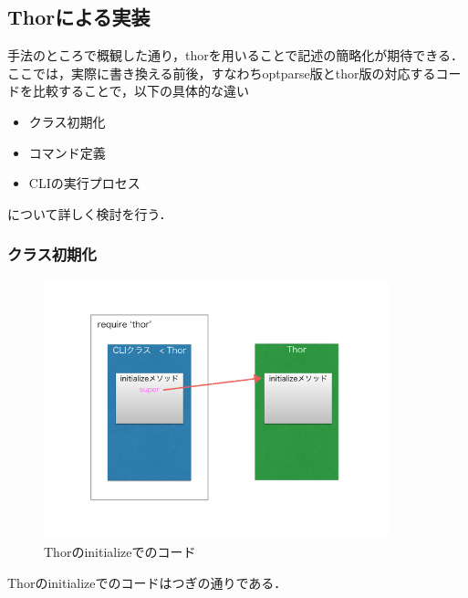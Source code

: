 \subsection{Thorによる実装}
手法のところで概観した通り，thorを用いることで記述の簡略化が期待できる．ここでは，実際に書き換える前後，すなわちoptparse版とthor版の対応するコードを比較することで，以下の具体的な違い

\begin{itemize}
\item クラス初期化
\item コマンド定義
\item CLIの実行プロセス
\end{itemize}
について詳しく検討を行う．

\subsubsection{クラス初期化}
\begin{figure}[htbp]\begin{center}
\includegraphics[width=10cm,bb= 0 0 737 553]{../figs/./hikiutils_yamane.003.jpg}
\caption{Thorのinitializeでのコード}
\label{default}\end{center}\end{figure}
Thorのinitializeでのコードはつぎの通りである．

